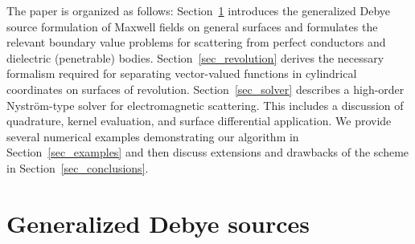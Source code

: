 \documentclass[11pt]{article}
\numberwithin{equation}{section}
\begin{document}
The paper is organized as follows: Section~\ref{sec_gendebye}
introduces the generalized Debye source formulation of Maxwell fields
on general surfaces and formulates the relevant boundary value
problems for scattering from perfect conductors and dielectric
(penetrable) bodies.  Section~\ref{sec_revolution} derives the
necessary formalism required for separating vector-valued functions in
cylindrical coordinates on surfaces of revolution.
Section~\ref{sec_solver} describes a high-order Nystr\"om-type solver
for electromagnetic scattering. This includes a discussion of
quadrature, kernel evaluation, and surface differential application.
We provide several numerical examples demonstrating our algorithm in
Section~\ref{sec_examples} and then discuss extensions and drawbacks
of the scheme in Section~\ref{sec_conclusions}.




\section{Generalized Debye sources}
\label{sec_gendebye}
\end{document}
